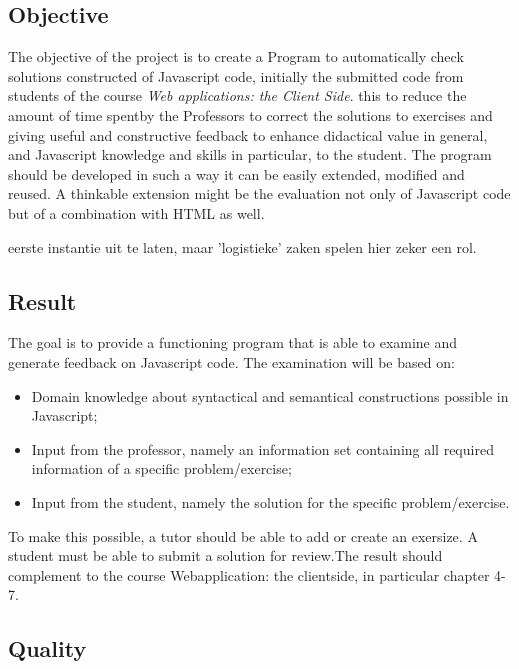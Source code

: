 \documentclass{article}
\begin{document}
\subsection{Objective}

The objective of the project is to create a Program to automatically check 
solutions constructed of Javascript code, initially the submitted code from 
students of the course {\em Web applications: the Client Side}. this to reduce 
the amount of time spentby the Professors to correct the solutions to exercises 
and giving useful and constructive feedback to enhance didactical value in 
general, and Javascript knowledge and skills in particular, to the student. The 
program should be developed in such a way it can be easily extended, modified 
and reused. A thinkable extension might be the evaluation not only of Javascript 
code but of a combination with HTML as well. 

eerste instantie uit te laten, maar 'logistieke' zaken spelen hier zeker een 
rol. 

\subsection{Result} 

The goal is to provide a functioning program that is able to examine and 
generate feedback on Javascript code. The examination will be based on: 

\begin{itemize} \item Domain knowledge about syntactical and semantical 
constructions possible in Javascript; \item Input from the professor, namely an 
information set containing all required information of a specific 
problem/exercise; \item Input from the student, namely the solution for the 
specific problem/exercise. \end{itemize} To make this possible, a tutor should 
be able to add or create an exersize. A student must be able to submit a 
solution for review.The result should complement to the course Webapplication: 
the clientside, in particular chapter 4-7. 

\subsection{Quality} 
\end{document}
